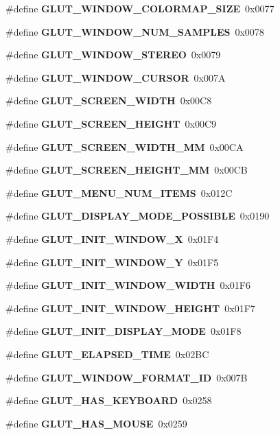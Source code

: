 \begin{DoxyCompactItemize}
\item 
\#define {\bf G\+L\+U\+T\+\_\+\+W\+I\+N\+D\+O\+W\+\_\+\+C\+O\+L\+O\+R\+M\+A\+P\+\_\+\+S\+I\+Z\+E}~0x0077
\item 
\#define {\bf G\+L\+U\+T\+\_\+\+W\+I\+N\+D\+O\+W\+\_\+\+N\+U\+M\+\_\+\+S\+A\+M\+P\+L\+E\+S}~0x0078
\item 
\#define {\bf G\+L\+U\+T\+\_\+\+W\+I\+N\+D\+O\+W\+\_\+\+S\+T\+E\+R\+E\+O}~0x0079
\item 
\#define {\bf G\+L\+U\+T\+\_\+\+W\+I\+N\+D\+O\+W\+\_\+\+C\+U\+R\+S\+O\+R}~0x007\+A
\item 
\#define {\bf G\+L\+U\+T\+\_\+\+S\+C\+R\+E\+E\+N\+\_\+\+W\+I\+D\+T\+H}~0x00\+C8
\item 
\#define {\bf G\+L\+U\+T\+\_\+\+S\+C\+R\+E\+E\+N\+\_\+\+H\+E\+I\+G\+H\+T}~0x00\+C9
\item 
\#define {\bf G\+L\+U\+T\+\_\+\+S\+C\+R\+E\+E\+N\+\_\+\+W\+I\+D\+T\+H\+\_\+\+M\+M}~0x00\+C\+A
\item 
\#define {\bf G\+L\+U\+T\+\_\+\+S\+C\+R\+E\+E\+N\+\_\+\+H\+E\+I\+G\+H\+T\+\_\+\+M\+M}~0x00\+C\+B
\item 
\#define {\bf G\+L\+U\+T\+\_\+\+M\+E\+N\+U\+\_\+\+N\+U\+M\+\_\+\+I\+T\+E\+M\+S}~0x012\+C
\item 
\#define {\bf G\+L\+U\+T\+\_\+\+D\+I\+S\+P\+L\+A\+Y\+\_\+\+M\+O\+D\+E\+\_\+\+P\+O\+S\+S\+I\+B\+L\+E}~0x0190
\item 
\#define {\bf G\+L\+U\+T\+\_\+\+I\+N\+I\+T\+\_\+\+W\+I\+N\+D\+O\+W\+\_\+\+X}~0x01\+F4
\item 
\#define {\bf G\+L\+U\+T\+\_\+\+I\+N\+I\+T\+\_\+\+W\+I\+N\+D\+O\+W\+\_\+\+Y}~0x01\+F5
\item 
\#define {\bf G\+L\+U\+T\+\_\+\+I\+N\+I\+T\+\_\+\+W\+I\+N\+D\+O\+W\+\_\+\+W\+I\+D\+T\+H}~0x01\+F6
\item 
\#define {\bf G\+L\+U\+T\+\_\+\+I\+N\+I\+T\+\_\+\+W\+I\+N\+D\+O\+W\+\_\+\+H\+E\+I\+G\+H\+T}~0x01\+F7
\item 
\#define {\bf G\+L\+U\+T\+\_\+\+I\+N\+I\+T\+\_\+\+D\+I\+S\+P\+L\+A\+Y\+\_\+\+M\+O\+D\+E}~0x01\+F8
\item 
\#define {\bf G\+L\+U\+T\+\_\+\+E\+L\+A\+P\+S\+E\+D\+\_\+\+T\+I\+M\+E}~0x02\+B\+C
\item 
\#define {\bf G\+L\+U\+T\+\_\+\+W\+I\+N\+D\+O\+W\+\_\+\+F\+O\+R\+M\+A\+T\+\_\+\+I\+D}~0x007\+B
\item 
\#define {\bf G\+L\+U\+T\+\_\+\+H\+A\+S\+\_\+\+K\+E\+Y\+B\+O\+A\+R\+D}~0x0258
\item 
\#define {\bf G\+L\+U\+T\+\_\+\+H\+A\+S\+\_\+\+M\+O\+U\+S\+E}~0x0259

\end{DoxyCompactItemize}
